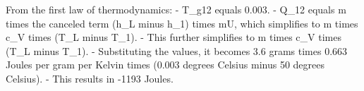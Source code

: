 From the first law of thermodynamics:
- T_g12 equals 0.003.
- Q_12 equals m times the canceled term (h_L minus h_1) times mU, which simplifies to m times c_V times (T_L minus T_1).
- This further simplifies to m times c_V times (T_L minus T_1).
- Substituting the values, it becomes 3.6 grams times 0.663 Joules per gram per Kelvin times (0.003 degrees Celsius minus 50 degrees Celsius).
- This results in -1193 Joules.